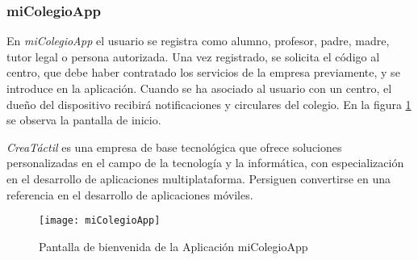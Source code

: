		\subsubsection{miColegioApp}
		En {\it miColegioApp} \cite{4:micolegioapp:online} el usuario se registra como alumno, profesor, padre, madre, tutor legal o persona autorizada. Una vez registrado, se solicita el código al centro, que debe haber contratado los servicios de la empresa previamente, y se introduce en la aplicación. Cuando se ha asociado al usuario con un centro, el dueño del dispositivo recibirá notificaciones y circulares del colegio.
		En la figura \ref{fig:miColegioApp} se observa la pantalla de inicio.
		
		{\it CreaTáctil} \cite{24:creatactil:online} es una empresa de base tecnológica que ofrece soluciones personalizadas en el campo de la tecnología y la informática, con especialización en el desarrollo de aplicaciones multiplataforma.
		Persiguen convertirse en una referencia en el desarrollo de aplicaciones móviles.
		
		\begin{figure}[h !]
			\centering
			\texttt{[image: miColegioApp]}
			\caption{Pantalla de bienvenida de la Aplicación miColegioApp}
			\label{fig:miColegioApp}
		\end{figure}